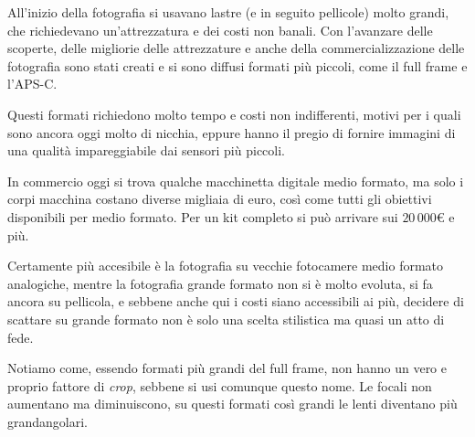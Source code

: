 All'inizio della fotografia si usavano lastre (e in seguito pellicole) molto grandi, che richiedevano un'attrezzatura e dei costi non banali. Con l'avanzare delle scoperte, delle migliorie delle attrezzature e anche della commercializzazione delle fotografia sono stati creati e si sono diffusi formati più piccoli, come il full frame e l'APS-C.

Questi formati richiedono molto tempo e costi non indifferenti, motivi per i quali sono ancora oggi molto di nicchia, eppure hanno il pregio di fornire immagini di una qualità impareggiabile dai sensori più piccoli.

In commercio oggi si trova qualche macchinetta digitale medio formato, ma solo i corpi macchina costano diverse migliaia di euro, così come tutti gli obiettivi disponibili per medio formato. Per un kit completo si può arrivare sui $20\,000 \euro{}$ e più.

Certamente più accesibile è la fotografia su vecchie fotocamere medio formato analogiche, mentre la fotografia grande formato non si è molto evoluta, si fa ancora su pellicola, e sebbene anche qui i costi siano accessibili ai più, decidere di scattare su grande formato non è solo una scelta stilistica ma quasi un atto di fede.

Notiamo come, essendo formati più grandi del full frame, non hanno un vero e proprio fattore di \textit{crop}, sebbene si usi comunque questo nome. Le focali non aumentano ma diminuiscono, su questi formati così grandi le lenti diventano più grandangolari.